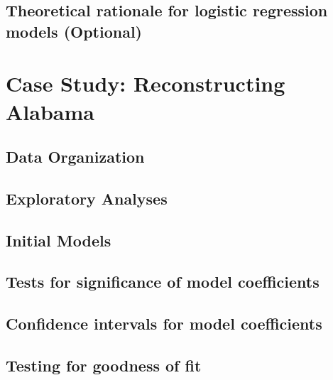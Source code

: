 \documentclass[
]{krantz}
\begin{document}
\hypertarget{theoretical-rationale-for-logistic-regression-models-optional}{%
\subsection{Theoretical rationale for logistic regression models (Optional)}\label{theoretical-rationale-for-logistic-regression-models-optional}}

\hypertarget{case-study-reconstructing-alabama}{%
\section{Case Study: Reconstructing Alabama}\label{case-study-reconstructing-alabama}}

\hypertarget{data-organization-3}{%
\subsection{Data Organization}\label{data-organization-3}}

\hypertarget{exploratory-analyses}{%
\subsection{Exploratory Analyses}\label{exploratory-analyses}}

\hypertarget{initial-models-1}{%
\subsection{Initial Models}\label{initial-models-1}}

\hypertarget{sec-logisticInf}{%
\subsection{Tests for significance of model coefficients}\label{sec-logisticInf}}

\hypertarget{confidence-intervals-for-model-coefficients}{%
\subsection{Confidence intervals for model coefficients}\label{confidence-intervals-for-model-coefficients}}

\hypertarget{testing-for-goodness-of-fit}{%
\subsection{Testing for goodness of fit}\label{testing-for-goodness-of-fit}}
\end{document}
